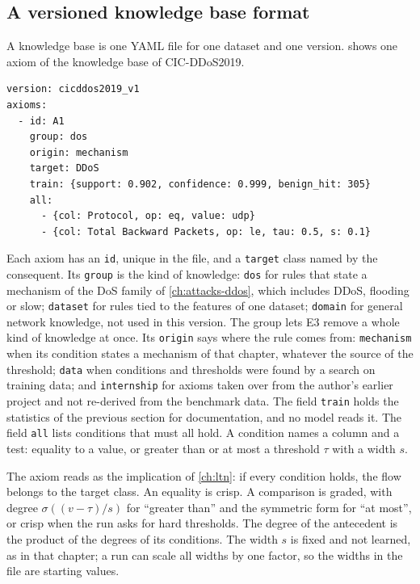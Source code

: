 \subsection{A versioned knowledge base format}
\label{sec:kb-format}

A knowledge base is one YAML file for one dataset and one version.
 shows one axiom of the knowledge base of CIC-DDoS2019.

\begin{lstlisting}[caption={The first axiom of the knowledge base \texttt{cicddos2019\_v1}.},label={lst:kb},float=t,numbers=none,basicstyle=\ttfamily\scriptsize,breaklines=true,frame=single]
version: cicddos2019_v1
axioms:
  - id: A1
    group: dos
    origin: mechanism
    target: DDoS
    train: {support: 0.902, confidence: 0.999, benign_hit: 305}
    all:
      - {col: Protocol, op: eq, value: udp}
      - {col: Total Backward Packets, op: le, tau: 0.5, s: 0.1}
\end{lstlisting}

Each axiom has an \texttt{id}, unique in the file, and a \texttt{target} class named
by the consequent. Its \texttt{group} is the kind of knowledge: \texttt{dos} for
rules that state a mechanism of the DoS family of \cref{ch:attacks-ddos}, which
includes DDoS, flooding or slow; \texttt{dataset} for rules tied to the features of
one dataset; \texttt{domain} for general network knowledge, not used in this version.
The group lets E3 remove a whole kind of knowledge at once. Its \texttt{origin} says
where the rule comes from: \texttt{mechanism} when its condition states a mechanism
of that chapter, whatever the source of the threshold; \texttt{data} when
conditions and thresholds were found by a search on training data; and
\texttt{internship} for axioms taken over from the author's earlier project and not
re-derived from the benchmark data. The field \texttt{train} holds the statistics of
the previous section for documentation, and no model reads it. The field
\texttt{all} lists conditions that must all hold. A condition names a column and a
test: equality to a value, or greater than or at most a threshold $\tau$ with a
width $s$.

The axiom reads as the implication of \cref{ch:ltn}: if every condition holds, the
flow belongs to the target class. An equality is crisp. A comparison is graded, with
degree $\sigma((v-\tau)/s)$ for ``greater than'' and the symmetric form for ``at
most'', or crisp when the run asks for hard thresholds. The degree of the antecedent
is the product of the degrees of its conditions. The width $s$ is fixed and not
learned, as in that chapter; a run can scale all widths by one factor, so the
widths in the file are starting values.

